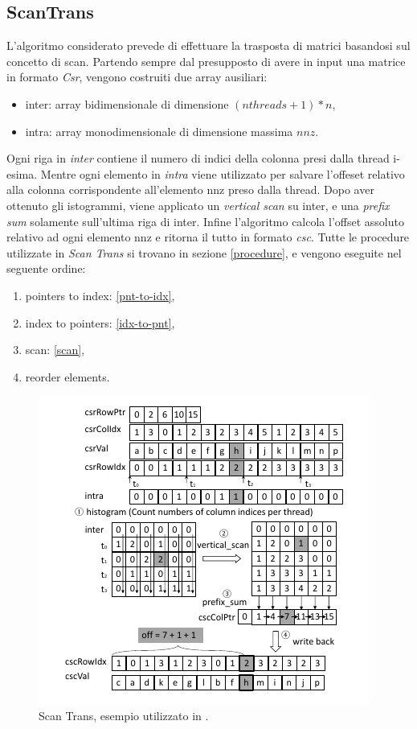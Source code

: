 \documentclass[]{IEEEtran}
\begin{document}
	\subsection{ScanTrans}
	L'algoritmo considerato prevede di effettuare la trasposta di matrici basandosi sul concetto di scan. Partendo sempre dal presupposto di avere in input una matrice in formato \textit{Csr}, vengono costruiti due array ausiliari:
	\begin{itemize}
		\item inter: array bidimensionale di dimensione $ (nthreads+1) * n $,
		\item intra: array monodimensionale di dimensione massima $ nnz $.
	\end{itemize}
	Ogni riga in \textit{inter} contiene il numero di indici della colonna presi dalla thread i-esima. Mentre ogni elemento in \textit{intra} viene utilizzato per salvare l'offeset relativo alla colonna corrispondente all'elemento nnz preso dalla thread. Dopo aver ottenuto gli istogrammi, viene applicato un \textit{vertical scan} su inter, e una \textit{prefix sum} solamente sull'ultima riga di inter. Infine l'algoritmo calcola l'offset assoluto relativo ad ogni elemento nnz e ritorna il tutto in formato \textit{csc}.\newline
	Tutte le procedure utilizzate in \textit{Scan Trans} si trovano in sezione \ref{procedure}, e vengono eseguite nel seguente ordine:
	\begin{enumerate}
		\item pointers to index: \ref{pnt-to-idx},
		\item index to pointers: \ref{idx-to-pnt},
		\item scan: \ref{scan},
		\item reorder elements.
	\end{enumerate}
	
	\begin{figure}[H]
		\includegraphics[scale=0.6]{scantrans.png}
		\caption{Scan Trans, esempio utilizzato in \cite{parallelTrans}.}
		\label{scantrans}
	\end{figure}
	
\end{document}
